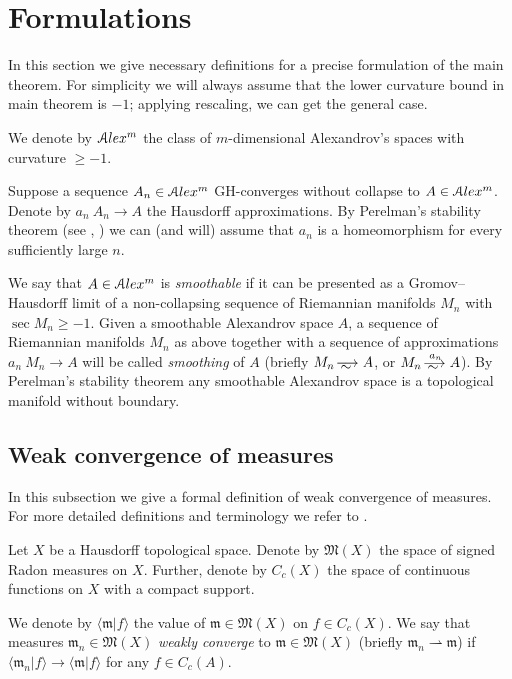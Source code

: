 \section{Formulations}

In this section we give necessary definitions for a precise formulation of the main theorem.
For simplicity  we will always assume that the lower
curvature bound in main theorem is  $-1$;
applying rescaling, we can get the general case.

We denote by
$\mathcal{A}lex^m$ the class of $m$-dimensional Alexandrov's spaces
with curvature $\ge -1$.

Suppose a sequence $A_n\in \mathcal{A}lex^m$ GH-converges without collapse to 
$A\in \mathcal{A}lex^m$.
Denote by $a_n\:A_n\to A$ the Hausdorff approximations.
By Perelman's stability theorem (see \cite{PerStab}, \cite{KapStab}) we can (and will) assume that $a_n$ is a homeomorphism for every sufficiently large $n$.

We say that $A\in \mathcal{A}lex^m$ is \emph{smoothable}
if it can be presented as a Gromov--Hausdorff limit of a non-collapsing sequence of Riemannian manifolds $M_n$ with $\sec M_n\ge-1$.
Given a smoothable Alexandrov space $A$,
a sequence of Riemannian manifolds $M_n$ as above
together with a sequence of approximations $a_n\:M_n\to A$
will be called \emph{smoothing} of $A$
(briefly $M_n\smooths{} A$, or $M_n\smooths{a_n} A$).
By Perelman's stability theorem any smoothable Alexandrov space is a topological manifold without boundary.

\subsection{Weak convergence of measures}

In this subsection we give a formal definition of weak convergence of measures.
For more detailed definitions and terminology we refer to
\cite{GMS}.

Let $X$ be a Hausdorff topological space.
Denote by $\mathfrak M(X)$ the space of signed Radon measures on $X$.
Further, denote by $C_c(X)$  the space of continuous functions on $X$
with a compact support. 

We  denote by $\langle \mathfrak m|f\rangle $ the value of $\mathfrak m\in\mathfrak M(X)$ on $f\in C_c(X)$.
We say that measures $\mathfrak m_n\in \mathfrak M(X)$ \emph{weakly converge} to $\mathfrak m\in \mathfrak M(X)$ (briefly
$\mathfrak m_n\rightharpoonup \mathfrak m$) if $\langle \mathfrak m_n|f\rangle \to \langle \mathfrak m|f\rangle $ for any $f\in C_c(A)$.


